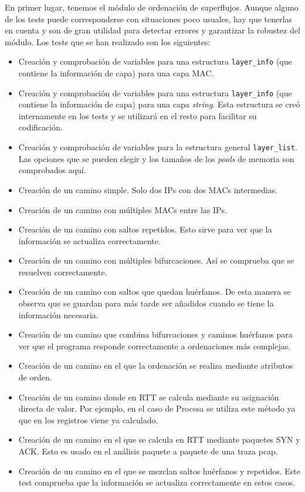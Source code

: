 \documentclass[twoside, 12pt]{epstfg}
\begin{document}
En primer lugar, tenemos el módulo de ordenación de superflujos. Aunque alguno de los tests puede corresponderse con situaciones poco usuales, hay que tenerlas en cuenta y son de gran utilidad para detectar errores y garantizar la robustez del módulo. Los tests que se han realizado son los siguientes:
\begin{itemize}
	\item Creación y comprobación de variables para una estructura \texttt{layer\_info} (que contiene la información de capa) para una capa MAC.
	\item Creación y comprobación de variables para una estructura \texttt{layer\_info} (que contiene la información de capa) para una capa \textit{string}. Esta estructura se creó internamente en los tests y se utilizará en el resto para facilitar su codificación.
	\item Creación y comprobación de variables para la estructura general \texttt{layer\_list}. Las opciones que se pueden elegir y los tamaños de los \textit{pools} de memoria son comprobados aquí.
	\item Creación de un camino simple. Solo dos IPs con dos MACs intermedias.
	\item Creación de un camino con múltiples MACs entre las IPs.
	\item Creación de un camino con saltos repetidos. Esto sirve para ver que la información se actualiza correctamente.
	\item Creación de un camino con múltiples bifurcaciones. Así se comprueba que se resuelven correctamente.
	\item Creación de un camino con saltos que quedan huérfanos. De esta manera se observa que se guardan para más tarde ser añadidos cuando se tiene la información necesaria.
	\item Creación de un camino que combina bifurcaciones y caminos huérfanos para ver que el programa responde correctamente a ordenaciones más complejas.
	\item Creación de un camino en el que la ordenación se realiza mediante atributos de orden.
	\item Creación de un camino donde en RTT se calcula mediante su asignación directa de valor. Por ejemplo, en el caso de Procesa se utiliza este método ya que en los registros viene ya calculado.
	\item Creación de un camino en el que se calcula en RTT mediante paquetes SYN y ACK. Esto es usado en el análisis paquete a paquete de una traza pcap.
	\item Creación de un camino en el que se mezclan saltos huérfanos y repetidos. Este test comprueba que la información se actualiza correctamente en estos casos.
\end{itemize}
\end{document}
